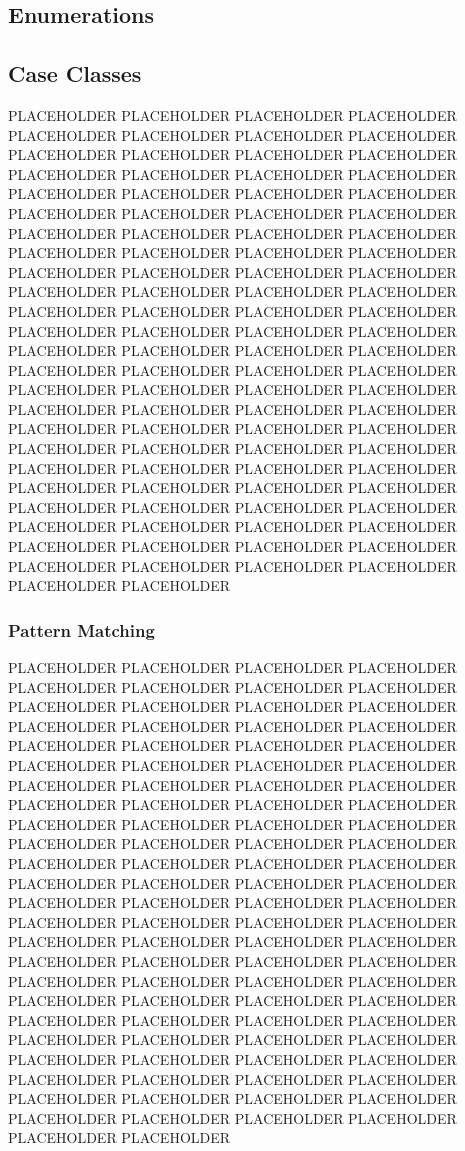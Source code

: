 \subsection{Enumerations}\label{sec:scala-enumerations}

\subsection{Case Classes}\label{sec:scala-case-classes}

PLACEHOLDER PLACEHOLDER PLACEHOLDER PLACEHOLDER PLACEHOLDER PLACEHOLDER PLACEHOLDER PLACEHOLDER PLACEHOLDER PLACEHOLDER PLACEHOLDER PLACEHOLDER PLACEHOLDER PLACEHOLDER PLACEHOLDER PLACEHOLDER PLACEHOLDER PLACEHOLDER PLACEHOLDER PLACEHOLDER PLACEHOLDER PLACEHOLDER PLACEHOLDER PLACEHOLDER PLACEHOLDER PLACEHOLDER PLACEHOLDER PLACEHOLDER PLACEHOLDER PLACEHOLDER PLACEHOLDER PLACEHOLDER PLACEHOLDER PLACEHOLDER PLACEHOLDER PLACEHOLDER PLACEHOLDER PLACEHOLDER PLACEHOLDER PLACEHOLDER PLACEHOLDER PLACEHOLDER PLACEHOLDER PLACEHOLDER PLACEHOLDER PLACEHOLDER PLACEHOLDER PLACEHOLDER PLACEHOLDER PLACEHOLDER PLACEHOLDER PLACEHOLDER PLACEHOLDER PLACEHOLDER PLACEHOLDER PLACEHOLDER PLACEHOLDER PLACEHOLDER PLACEHOLDER PLACEHOLDER PLACEHOLDER PLACEHOLDER PLACEHOLDER PLACEHOLDER PLACEHOLDER PLACEHOLDER PLACEHOLDER PLACEHOLDER PLACEHOLDER PLACEHOLDER PLACEHOLDER PLACEHOLDER PLACEHOLDER PLACEHOLDER PLACEHOLDER PLACEHOLDER PLACEHOLDER PLACEHOLDER PLACEHOLDER PLACEHOLDER PLACEHOLDER PLACEHOLDER PLACEHOLDER PLACEHOLDER PLACEHOLDER PLACEHOLDER PLACEHOLDER PLACEHOLDER PLACEHOLDER PLACEHOLDER PLACEHOLDER PLACEHOLDER PLACEHOLDER PLACEHOLDER PLACEHOLDER PLACEHOLDER PLACEHOLDER PLACEHOLDER

\subsubsection{Pattern Matching}

PLACEHOLDER PLACEHOLDER PLACEHOLDER PLACEHOLDER PLACEHOLDER PLACEHOLDER PLACEHOLDER PLACEHOLDER PLACEHOLDER PLACEHOLDER PLACEHOLDER PLACEHOLDER PLACEHOLDER PLACEHOLDER PLACEHOLDER PLACEHOLDER PLACEHOLDER PLACEHOLDER PLACEHOLDER PLACEHOLDER PLACEHOLDER PLACEHOLDER PLACEHOLDER PLACEHOLDER PLACEHOLDER PLACEHOLDER PLACEHOLDER PLACEHOLDER PLACEHOLDER PLACEHOLDER PLACEHOLDER PLACEHOLDER PLACEHOLDER PLACEHOLDER PLACEHOLDER PLACEHOLDER PLACEHOLDER PLACEHOLDER PLACEHOLDER PLACEHOLDER PLACEHOLDER PLACEHOLDER PLACEHOLDER PLACEHOLDER PLACEHOLDER PLACEHOLDER PLACEHOLDER PLACEHOLDER PLACEHOLDER PLACEHOLDER PLACEHOLDER PLACEHOLDER PLACEHOLDER PLACEHOLDER PLACEHOLDER PLACEHOLDER PLACEHOLDER PLACEHOLDER PLACEHOLDER PLACEHOLDER PLACEHOLDER PLACEHOLDER PLACEHOLDER PLACEHOLDER PLACEHOLDER PLACEHOLDER PLACEHOLDER PLACEHOLDER PLACEHOLDER PLACEHOLDER PLACEHOLDER PLACEHOLDER PLACEHOLDER PLACEHOLDER PLACEHOLDER PLACEHOLDER PLACEHOLDER PLACEHOLDER PLACEHOLDER PLACEHOLDER PLACEHOLDER PLACEHOLDER PLACEHOLDER PLACEHOLDER PLACEHOLDER PLACEHOLDER PLACEHOLDER PLACEHOLDER PLACEHOLDER PLACEHOLDER PLACEHOLDER PLACEHOLDER PLACEHOLDER PLACEHOLDER PLACEHOLDER PLACEHOLDER PLACEHOLDER PLACEHOLDER

